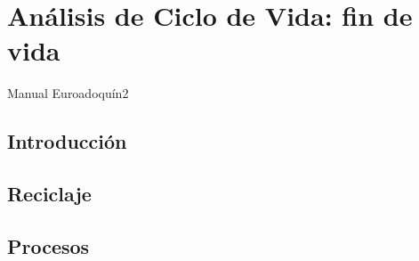 \chapter{Análisis de Ciclo de Vida: fin de vida}
Manual Euroadoquín2
\section{Introducción}
\section{Reciclaje}
\section{Procesos}
